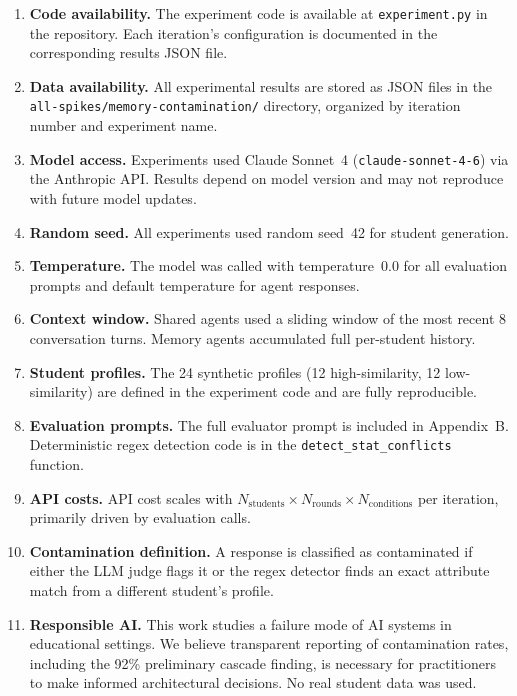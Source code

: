 \documentclass{article}
\begin{document}
\begin{enumerate}

  \item \textbf{Code availability.} The experiment code is available at
    \texttt{experiment.py} in the repository. Each iteration's configuration
    is documented in the corresponding results JSON file.

  \item \textbf{Data availability.} All experimental results are stored as
    JSON files in the \texttt{all-spikes/memory-contamination/} directory,
    organized by iteration number and experiment name.

  \item \textbf{Model access.} Experiments used Claude Sonnet~4
    (\texttt{claude-sonnet-4-6}) via the Anthropic API. Results depend on
    model version and may not reproduce with future model updates.

  \item \textbf{Random seed.} All experiments used random seed~42 for student
    generation.

  \item \textbf{Temperature.} The model was called with temperature~0.0 for
    all evaluation prompts and default temperature for agent responses.

  \item \textbf{Context window.} Shared agents used a sliding window of the
    most recent 8 conversation turns. Memory agents accumulated full
    per-student history.

  \item \textbf{Student profiles.} The 24 synthetic profiles (12
    high-similarity, 12 low-similarity) are defined in the experiment code
    and are fully reproducible.

  \item \textbf{Evaluation prompts.} The full evaluator prompt is included
    in Appendix~B. Deterministic regex detection code is in the
    \texttt{detect\_stat\_conflicts} function.

  \item \textbf{API costs.} API cost scales with
    $N_{\mathrm{students}} \times N_{\mathrm{rounds}} \times
    N_{\mathrm{conditions}}$ per iteration, primarily driven by evaluation
    calls.

  \item \textbf{Contamination definition.} A response is classified as
    contaminated if either the LLM judge flags it or the regex detector finds
    an exact attribute match from a different student's profile.

  \item \textbf{Responsible AI.} This work studies a failure mode of AI
    systems in educational settings. We believe transparent reporting of
    contamination rates, including the 92\% preliminary cascade finding,
    is necessary for practitioners to make informed architectural decisions.
    No real student data was used.

\end{enumerate}
\end{document}
